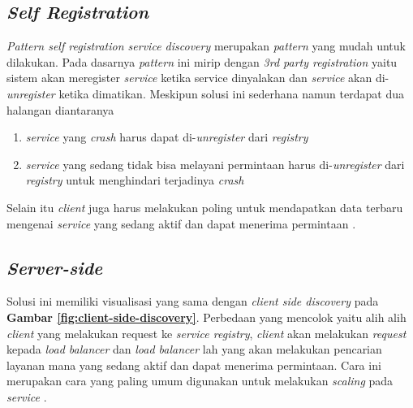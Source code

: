 \subsection{\textit{Self Registration}}
\textit{Pattern self registration service discovery} merupakan \textit{pattern} yang mudah untuk dilakukan. Pada dasarnya \textit{pattern} ini mirip dengan \textit{3rd party registration} yaitu sistem akan meregister \textit{service} ketika service dinyalakan dan \textit{service} akan di-\textit{unregister} ketika dimatikan. Meskipun solusi ini sederhana namun terdapat dua halangan diantaranya

\begin{enumerate}
  \item \textit{service} yang \textit{crash} harus dapat di-\textit{unregister} dari \textit{registry}
  \item \textit{service} yang sedang tidak bisa melayani permintaan harus di-\textit{unregister} dari \textit{registry} untuk menghindari terjadinya \textit{crash}
\end{enumerate}

Selain itu \textit{client} juga harus melakukan poling untuk mendapatkan data terbaru mengenai \textit{service} yang sedang aktif dan dapat menerima permintaan \parencite{selfregistration}.

\subsection{\textit{Server-side}}
Solusi ini memiliki visualisasi yang sama dengan \textit{client side discovery} pada \textbf{Gambar \ref{fig:client-side-discovery}}. Perbedaan yang mencolok yaitu alih alih \textit{client} yang melakukan request ke \textit{service registry}, \textit{client} akan melakukan \textit{request} kepada \textit{load balancer} dan \textit{load balancer} lah yang akan melakukan pencarian layanan mana yang sedang aktif dan dapat menerima permintaan. Cara ini merupakan cara yang paling umum digunakan untuk melakukan \textit{scaling} pada \textit{service} \parencite{servicesidediscovery}.
